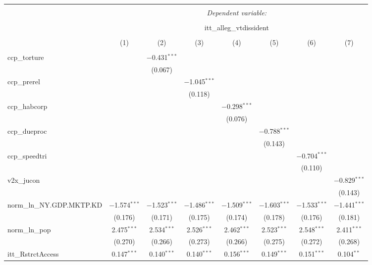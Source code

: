 
\begin{sidewaystable}[!htbp] \centering 
  \caption{} 
  \label{} 
\tiny 
\begin{tabular}{@{\extracolsep{5pt}}lccccccc} 
\\[-1.8ex]\hline 
\hline \\[-1.8ex] 
 & \multicolumn{7}{c}{\textit{Dependent variable:}} \\ 
\cline{2-8} 
\\[-1.8ex] & \multicolumn{7}{c}{itt\_alleg\_vtdissident} \\ 
\\[-1.8ex] & (1) & (2) & (3) & (4) & (5) & (6) & (7)\\ 
\hline \\[-1.8ex] 
 ccp\_torture &  & $-$0.431$^{***}$ &  &  &  &  &  \\ 
  &  & (0.067) &  &  &  &  &  \\ 
  ccp\_prerel &  &  & $-$1.045$^{***}$ &  &  &  &  \\ 
  &  &  & (0.118) &  &  &  &  \\ 
  ccp\_habcorp &  &  &  & $-$0.298$^{***}$ &  &  &  \\ 
  &  &  &  & (0.076) &  &  &  \\ 
  ccp\_dueproc &  &  &  &  & $-$0.788$^{***}$ &  &  \\ 
  &  &  &  &  & (0.143) &  &  \\ 
  ccp\_speedtri &  &  &  &  &  & $-$0.704$^{***}$ &  \\ 
  &  &  &  &  &  & (0.110) &  \\ 
  v2x\_jucon &  &  &  &  &  &  & $-$0.829$^{***}$ \\ 
  &  &  &  &  &  &  & (0.143) \\ 
  norm\_ln\_NY.GDP.MKTP.KD & $-$1.574$^{***}$ & $-$1.523$^{***}$ & $-$1.486$^{***}$ & $-$1.509$^{***}$ & $-$1.603$^{***}$ & $-$1.533$^{***}$ & $-$1.441$^{***}$ \\ 
  & (0.176) & (0.171) & (0.175) & (0.174) & (0.178) & (0.176) & (0.181) \\ 
  norm\_ln\_pop & 2.475$^{***}$ & 2.534$^{***}$ & 2.526$^{***}$ & 2.462$^{***}$ & 2.523$^{***}$ & 2.548$^{***}$ & 2.411$^{***}$ \\ 
  & (0.270) & (0.266) & (0.273) & (0.266) & (0.275) & (0.272) & (0.268) \\ 
  itt\_RstrctAccess & 0.147$^{***}$ & 0.140$^{***}$ & 0.140$^{***}$ & 0.156$^{***}$ & 0.149$^{***}$ & 0.151$^{***}$ & 0.104$^{**}$ \\ 

\end{tabular}
\end{sidewaystable}
